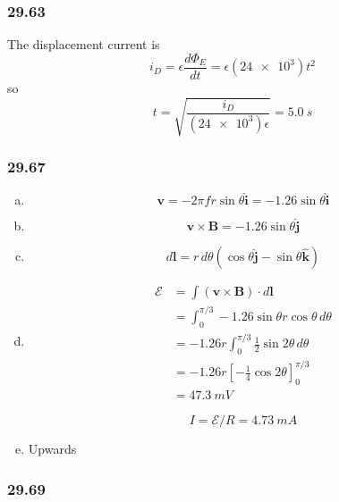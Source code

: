 \documentclass{article}
\begin{document}
\subsubsection{29.63}

The displacement current is \[i_D = \epsilon \frac{d \Phi_E}{dt} = \epsilon (\num{24e3}) t^2\] so \[t = \sqrt{\frac{i_D}{(\num{24e3}) \epsilon}} = \qty{5.0}{s}\]

\subsubsection{29.67}

\begin{enumerate}[(a)]
  \item \[\mathbf{v} = -2 \pi f r \sin \theta \hat{\mathbf{i}} = -1.26 \sin \theta \hat{\mathbf{i}}\]

  \item \[\mathbf{v} \times \mathbf{B} = -1.26 \sin \theta \hat{\mathbf{j}}\]

  \item \[d \mathbf{l} = r \,d \theta (\cos \theta \hat{\mathbf{j}} - \sin \theta \hat{\mathbf{k}})\]

  \item

        \begin{align*}
          \mathcal{E} & = \int (\mathbf{v} \times \mathbf{B}) \cdot d \mathbf{l}        \\
                      & = \int_0^{\pi / 3} -1.26 \sin \theta r \cos \theta \,d \theta   \\
                      & = -1.26 r \int_0^{\pi / 3} \frac{1}{2} \sin 2 \theta \,d \theta \\
                      & = -1.26 r \left[ -\frac{1}{4} \cos 2 \theta \right]_0^{\pi / 3} \\
                      & = \qty{47.3}{mV}
        \end{align*}

        \[I = \mathcal{E} / R = \qty{4.73}{mA}\]

  \item Upwards
\end{enumerate}

\subsubsection{29.69}
\end{document}
